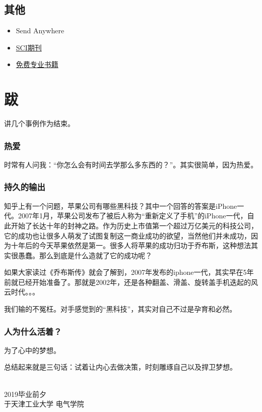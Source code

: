 \documentclass[UTF8,oneside]{ctexbook}
\begin{document}
\section{其他}
\begin{itemize}
	\item Send Anywhere
	\item \href{https://www.scimagojr.com}{SCI期刊}
	\item \href{http://libgen.io}{免费专业书籍}
\end{itemize}

\backmatter
\chapter*{跋}
讲几个事例作为结束。

\subsection*{热爱}
时常有人问我：“你怎么会有时间去学那么多东西的？”。其实很简单，因为热爱。

\subsection*{持久的输出}
知乎上有一个问题，苹果公司有哪些黑科技？其中一个回答的答案是iPhone一代。2007年1月，苹果公司发布了被后人称为“重新定义了手机”的iPhone一代，自此开始了长达十年的封神之路。作为历史上市值第一个超过万亿美元的科技公司，它的成功也让很多人萌发了试图复制这一商业成功的欲望，当然他们并未成功，因为十年后的今天苹果依然是第一。很多人将苹果的成功归功于乔布斯，这种想法其实很愚蠢。那么到底是什么造就了它的成功呢？

如果大家读过《乔布斯传》就会了解到，2007年发布的iphone一代，其实早在5年前就已经开始准备了。那就是2002年，还是各种翻盖、滑盖、旋转盖手机迭起的风云时代。。。

我们输的不冤枉。对手感觉到的“黑科技”，其实对自己不过是孕育和必然。

\subsection*{人为什么活着？}
为了心中的梦想。

\vspace{2cm}
总结起来就是三句话：试着让内心去做决策，时刻雕琢自己以及捍卫梦想。

\hspace{4cm}\\
\noindent2019毕业前夕\\
于天津工业大学 \quad 电气学院
\end{document}
